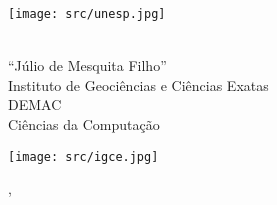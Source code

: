 \documentclass[12pt, openright, oneside, a4paper, chapter=TITLE, section=TITLE, subsection=TITLE, subsubsection=TITLE, brazil]{abntex2}
\begin{document}
\sloppy

\frenchspacing


\begin{capa}
    \thispagestyle{empty}
    \centering
    \vspace*{1cm}

    \begin{minipage}{0.2\linewidth}
        \centering
        \texttt{[image: src/unesp.jpg]}
    \end{minipage}%
    \hfill
    \begin{minipage}{0.6\linewidth}
        \centering
        {\large \imprimirinstituicao} \\
        {\large ``J\'ulio de Mesquita Filho''} \\
        {\large Instituto de Geociências e Ciências Exatas} \\
        {\large DEMAC} \\
        {\large Ciências da Computação}
    \end{minipage}%
    \hfill
    \begin{minipage}{0.2\linewidth}
        \centering
        \texttt{[image: src/igce.jpg]}
    \end{minipage}

    \vspace*{1cm}
    {\ABNTEXchapterfont\large\imprimirautor}
    \vspace*{\fill}

    {\ABNTEXchapterfont\bfseries \large \imprimirtitulo}
    \vspace*{\fill}

    {\large\imprimirtipotrabalho}
    \vspace*{\fill}

    {\large\imprimirlocal}, {\large\imprimirdata}
    \vspace*{1cm}
\end{capa}

\imprimirfolhaderosto*
\end{document}
